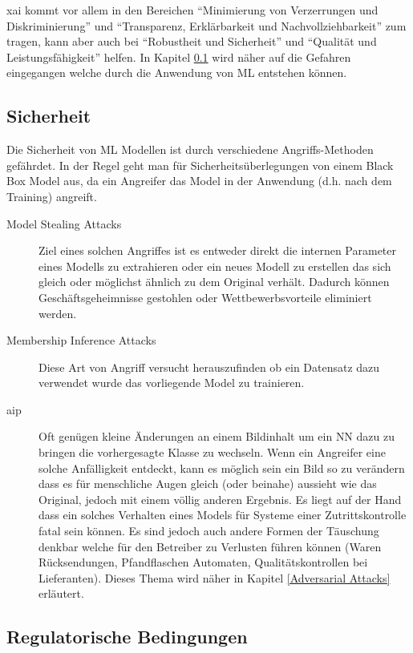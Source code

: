 \documentclass[
  12pt, %
  a4paper, %
  oneside, %
  openany, 
  numbers=noenddot, %
  BCOR=5mm, %
  parskip=half*, %
  thesis, %
]{bfhbook}
\begin{document}
\acrlong{xai} kommt vor allem in den Bereichen ``Minimierung von Verzerrungen und Diskriminierung'' und ``Transparenz, Erklärbarkeit und Nachvollziehbarkeit'' zum tragen, kann aber auch bei ``Robustheit und Sicherheit'' und ``Qualität und Leistungsfähigkeit'' helfen. In Kapitel \ref{Sicherheit} wird näher auf die Gefahren eingegangen welche durch die Anwendung von \Gls{ML} entstehen können.

\subsection{Sicherheit}
\label{Sicherheit}
Die Sicherheit von \Gls{ML} Modellen ist durch verschiedene Angriffs-Methoden gefährdet. In der Regel geht man für Sicherheitsüberlegungen von einem \Gls{Black Box} Model aus, da ein Angreifer das Model in der Anwendung (d.h. nach dem Training) angreift.
\begin{description}
	\item[Model Stealing Attacks] Ziel eines solchen Angriffes ist es entweder direkt die internen Parameter eines Modells zu extrahieren oder ein neues Modell zu erstellen das sich gleich oder möglichst ähnlich zu dem Original verhält. Dadurch können Geschäftsgeheimnisse gestohlen oder Wettbewerbsvorteile eliminiert werden.
	\item[Membership Inference Attacks] Diese Art von Angriff versucht herauszufinden ob ein Datensatz dazu verwendet wurde das vorliegende Model zu trainieren.
	\item[\acrfull{aip}] Oft genügen kleine Änderungen an einem Bildinhalt um ein \Gls{NN} dazu zu bringen die vorhergesagte Klasse zu wechseln. Wenn ein Angreifer eine solche Anfälligkeit entdeckt, kann es möglich sein ein Bild so zu verändern dass es für menschliche Augen gleich (oder beinahe) aussieht wie das Original, jedoch mit einem völlig anderen Ergebnis. Es liegt auf der Hand dass ein solches Verhalten eines Models für Systeme einer Zutrittskontrolle fatal sein können. Es sind jedoch auch andere Formen der Täuschung denkbar welche für den Betreiber zu Verlusten führen können (Waren Rücksendungen, Pfandflaschen Automaten, Qualitätskontrollen bei Lieferanten). Dieses Thema wird näher in Kapitel \ref{Adversarial Attacks} erläutert.
\end{description}

\subsection{Regulatorische Bedingungen}
\end{document}
